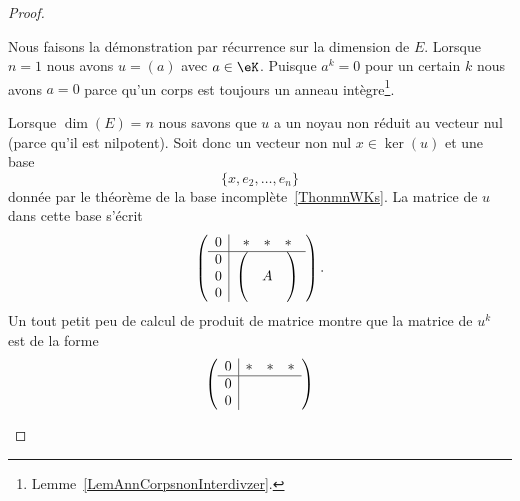 \begin{proof}
	\begin{subproof}
		\spitem[\( \Rightarrow\)]
		Nous faisons la démonstration par récurrence sur la dimension de \( E\). Lorsque \( n=1\) nous avons \( u=(a)\) avec \( a\in \eK\). Puisque \( a^k=0\) pour un certain \( k\) nous avons \( a=0\) parce qu'un corps est toujours un anneau intègre\footnote{Lemme~\ref{LemAnnCorpsnonInterdivzer}.}.

		Lorsque \( \dim(E)=n\) nous savons que \( u\) a un noyau non réduit au vecteur nul (parce qu'il est nilpotent). Soit donc un vecteur non nul \( x\in\ker(u)\) et une base
		\begin{equation}
			\{ x,e_2,\ldots, e_n \}
		\end{equation}
		donnée par le théorème de la base incomplète~\ref{ThonmnWKs}. La matrice de \( u\) dans cette base s'écrit
		\begin{equation}
			\begin{pmatrix}
				\begin{array}[]{c|c}
					0                          & \begin{matrix}
						* & * & *
					\end{matrix} \\
					\hline
					\begin{matrix}
						0 \\
						0 \\
						0
					\end{matrix} &
					\begin{pmatrix}
						 &   & \\
						 & A & \\
						 &   &
					\end{pmatrix}
				\end{array}
			\end{pmatrix}.
		\end{equation}
		Un tout petit peu de calcul de produit de matrice montre que la matrice de \( u^k\) est de la forme
		\begin{equation}
			\begin{pmatrix}
				\begin{array}[]{c|c}
					0                          & \begin{matrix}
						* & * & *
					\end{matrix} \\
					\hline
					\begin{matrix}
						0 \\
						0 \\

\end{matrix}
\end{array}
\end{pmatrix}
\end{equation}
\end{subproof}
\end{proof}
